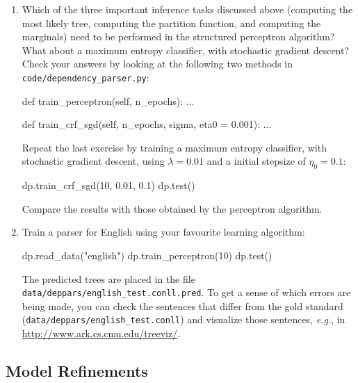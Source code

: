 \begin{exercise}
\begin{enumerate}
\item Which of the three important inference tasks discussed above (computing the most likely tree, 
computing the partition function, and computing the marginals) need to be performed in the structured perceptron algorithm? 
What about a maximum entropy classifier, with stochastic gradient descent?  
Check your answers by looking at the following two methods in {\tt code/dependency\_parser.py}:
\begin{python}
def train_perceptron(self, n_epochs):
...

def train_crf_sgd(self, n_epochs, sigma, eta0 = 0.001):
...
\end{python}
Repeat the last exercise by training a maximum entropy classifier, with stochastic gradient descent, 
using $\lambda = 0.01$ and a initial stepsize of $\eta_0 = 0.1$: 
\begin{python}
dp.train_crf_sgd(10, 0.01, 0.1)
dp.test()
\end{python}
Compare the results with those obtained by the perceptron algorithm. 

\item Train a parser for English using your favourite learning algorithm: 
\begin{python}
dp.read_data("english")
dp.train_perceptron(10)
dp.test()
\end{python}
The predicted trees are placed in the file {\tt data/deppars/english\_test.conll.pred}. 
To get a sense of which errors are being made, you can 
check the sentences that differ from the gold standard ({\tt data/deppars/english\_test.conll}) 
and visualize those sentences, \emph{e.g.}, in 
\url{http://www.ark.cs.cmu.edu/treeviz/}. 
\end{enumerate}

\end{exercise}

\subsection{Model Refinements}

